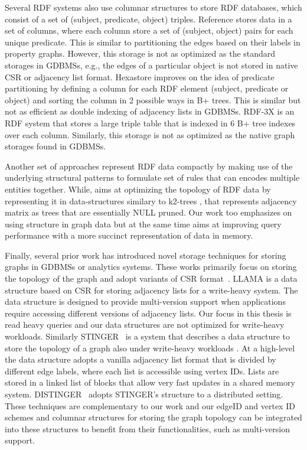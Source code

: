 Several RDF systems also use columnar structures to store RDF databases, which consist of a set of (subject, predicate, object) triples. Reference \cite{rdf-vertical} stores data in a set of columns, where each column store a set of (subject, object) pairs for each unique predicate. This is similar to partitioning the edges based on their labels in property graphs. However, this storage is not as optimized as the standard storages in GDBMSs, e.g., the edges of a particular object is not stored in native CSR or adjacency list format. Hexastore \cite{hexastore} improves on the idea of predicate partitioning by defining a column for each RDF element (subject, predicate or object) and sorting the column in 2 possible ways in B+ trees. This is similar but not as efficient as double indexing of adjacency lists in GDBMSs. RDF-3X \cite{rdf-3x} is an RDF system that stores a large triple table that is indexed in 6 B+ tree indexes over each column. Similarly, this storage is not as optimized as the native graph storages found in GDBMSs.

Another set of approaches \cite{comp-rdf, rbcomp, hdt} represent RDF data compactly by making use of the underlying structural patterns to formulate set of rules that can encodes multiple entities together. While, \cite{k2triples, ik2trees} aims at optimizing the topology of RDF data by representing it in data-structures similary to k2-trees \cite{k2trees}, that represents adjacency matrix as trees that are essentially NULL pruned. Our work too emphasizes on using structure in graph data but at the same time aims at improving query performance with a more succinct representation of data in memory.

Finally, several prior work has introduced novel storage techniques for storing graphs in GDBMSs or analytics systems. These works primarily focus on storing the topology of the graph and adopt variants of CSR format~\cite{yale}. LLAMA is a data structure based on CSR for storing adjacency lists for a write-heavy system. The data structure is designed to provide multi-version support when applications require accessing different versions of adjacency lists. Our focus in this thesis is read heavy queries and our data structures are not optimized for write-heavy workloads. Similarly STINGER~\cite{stinger} is a system that describes a data structure to store the topology of a graph also under write-heavy workloads . At a high-level the data structure adopts a vanilla adjacency list format that is divided by different edge labels, where each list is accessible using vertex IDs. Lists are stored in a linked list of blocks that allow very fast updates in a shared memory system. DISTINGER~\cite{distinger} adopts STINGER's structure to a distributed setting. These techniques are complementary to our work and our edgeID and vertex ID schemes and columnar structures for storing the graph topology can be integrated into these structures to benefit from their functionalities, such as multi-version support. 




